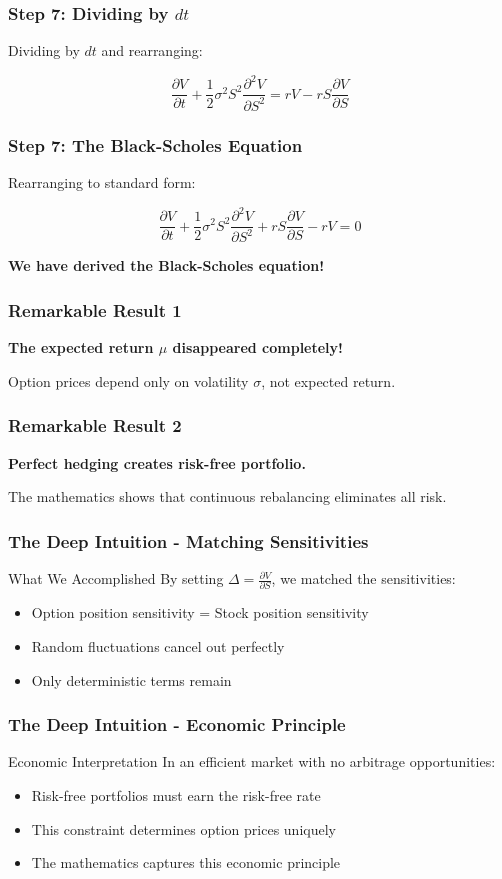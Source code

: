 \documentclass[aspectratio=169]{beamer}
\begin{document}
\begin{frame}
\frametitle{Step 7: Dividing by \(dt\)}
Dividing by \(dt\) and rearranging:

\[\frac{\partial V}{\partial t} + \frac{1}{2}\sigma^2 S^2 \frac{\partial^2 V}{\partial S^2} = rV - rS\frac{\partial V}{\partial S}\]
\end{frame}

\begin{frame}
\frametitle{Step 7: The Black-Scholes Equation}
Rearranging to standard form:

\[\frac{\partial V}{\partial t} + \frac{1}{2}\sigma^2 S^2 \frac{\partial^2 V}{\partial S^2} + rS\frac{\partial V}{\partial S} - rV = 0\]

\textbf{We have derived the Black-Scholes equation!}
\end{frame}

\begin{frame}
\frametitle{Remarkable Result 1}
\textbf{The expected return \(\mu\) disappeared completely!}

Option prices depend only on volatility \(\sigma\), not expected return.
\end{frame}

\begin{frame}
\frametitle{Remarkable Result 2}
\textbf{Perfect hedging creates risk-free portfolio.}

The mathematics shows that continuous rebalancing eliminates all risk.
\end{frame}

\begin{frame}
\frametitle{The Deep Intuition - Matching Sensitivities}
\begin{block}{What We Accomplished}
By setting \(\Delta = \frac{\partial V}{\partial S}\), we matched the sensitivities:
\begin{itemize}
\item Option position sensitivity = Stock position sensitivity
\item Random fluctuations cancel out perfectly
\item Only deterministic terms remain
\end{itemize}
\end{block}
\end{frame}

\begin{frame}
\frametitle{The Deep Intuition - Economic Principle}
\begin{block}{Economic Interpretation}
In an efficient market with no arbitrage opportunities:
\begin{itemize}
\item Risk-free portfolios must earn the risk-free rate
\item This constraint determines option prices uniquely
\item The mathematics captures this economic principle
\end{itemize}
\end{block}
\end{frame}
\end{document}
